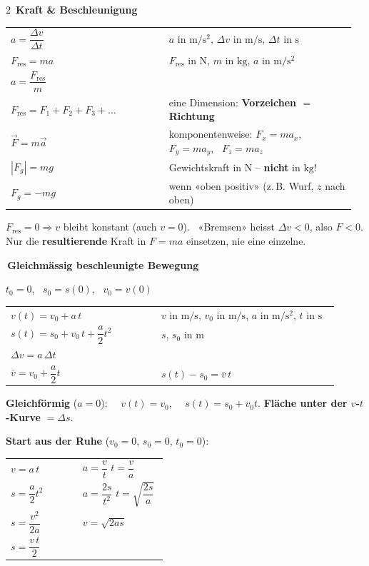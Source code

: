 \documentclass[8pt,a4paper]{extarticle}
\makeatletter
\newcommand{\T}[1]{%
  \vspace{2.2mm plus 0.6mm}%
  \noindent\colorbox{ak}{\color{white}\bfseries\small\,#1\,}\par
  \vspace{0.8mm}\nobreak\ignorespaces}
\newcommand{\FT}[1]{%
  \begin{tabular}{@{}>{\raggedright\arraybackslash}p{0.44\linewidth}@{\hspace{3pt}}>{\raggedright\arraybackslash}p{0.52\linewidth}@{}}
  #1\end{tabular}\par}
\newcommand{\hk}[1]{\textcolor{ak}{\textbf{#1}}}
\makeatother
\begin{document}
\begin{multicols}{2}
\T{Kraft \& Beschleunigung}

\FT{
$a=\dfrac{\Delta v}{\Delta t}$ & $a$ in $\mathrm{m/s^2}$, $\Delta v$ in $\mathrm{m/s}$, $\Delta t$ in $\mathrm{s}$ \\
$F_{\text{res}} = ma$ & $F_{\text{res}}$ in $\mathrm{N}$, $m$ in $\mathrm{kg}$, $a$ in $\mathrm{m/s^2}$ \\
$a=\dfrac{F_{\text{res}}}{m}$ & \\
$F_{\text{res}} = F_1+F_2+F_3+\dots$ & eine Dimension: \textbf{Vorzeichen $=$ Richtung} \\
$\vec F = m\vec a$ & komponentenweise: $F_x = ma_x$, \ $F_y=ma_y$, \ $F_z=ma_z$ \\
$|F_g| = mg$ & Gewichtskraft in $\mathrm{N}$ – \textbf{nicht} in $\mathrm{kg}$! \\
$F_g = -mg$ & wenn «oben positiv» (z.\,B. Wurf, $z$ nach oben) \\
}

\vspace{0.8mm}
$F_{\text{res}}=0 \Rightarrow v$ bleibt konstant (auch $v=0$). \ «Bremsen» heisst $\Delta v<0$, also $F<0$.
Nur die \textbf{resultierende} Kraft in $F=ma$ einsetzen, nie eine einzelne.

\T{Gleichmässig beschleunigte Bewegung}

$t_0 = 0$, \ $s_0 = s(0)$, \ $v_0 = v(0)$

\FT{
$v(t) = v_0 + a\,t$ & $v$ in $\mathrm{m/s}$, $v_0$ in $\mathrm{m/s}$, $a$ in $\mathrm{m/s^2}$, $t$ in $\mathrm{s}$ \\
$s(t) = s_0 + v_0\,t + \dfrac{a}{2}t^2$ & $s$, $s_0$ in $\mathrm{m}$ \\
$\Delta v = a\,\Delta t$ & \\
$\bar v = v_0+\dfrac{a}{2}t$ & $s(t)-s_0 = \bar v\,t$ \\
}

\vspace{0.8mm}
\hk{Gleichförmig} ($a=0$): \ \ $v(t)=v_0$, \ \ $s(t)=s_0+v_0 t$. \quad
\hk{Fläche unter der $v$-$t$-Kurve} $= \Delta s$.

\vspace{0.8mm}
\hk{Start aus der Ruhe} ($v_0=0$, $s_0=0$, $t_0=0$):

\FT{
$v = a\,t$ & $a = \dfrac{v}{t}$ \quad $t = \dfrac{v}{a}$ \\
$s = \dfrac{a}{2}t^2$ & $a = \dfrac{2s}{t^2}$ \quad $t=\sqrt{\dfrac{2s}{a}}$ \\
$s = \dfrac{v^2}{2a}$ & $v=\sqrt{2as}$ \\
$s = \dfrac{v\,t}{2}$ & \\
}


\end{multicols}
\end{document}
